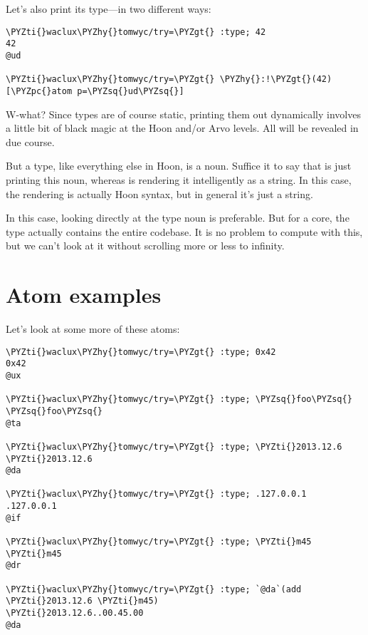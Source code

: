 Let's also print its type---in two different ways:

\begin{framed_shaded}
\begin{Verbatim}[fontsize=\relsize{-2.5},fontseries=b,commandchars=\\\{\}]
\PYZti{}waclux\PYZhy{}tomwyc/try=\PYZgt{} :type; 42
42
@ud

\PYZti{}waclux\PYZhy{}tomwyc/try=\PYZgt{} \PYZhy{}:!\PYZgt{}(42)
[\PYZpc{}atom p=\PYZsq{}ud\PYZsq{}]
\end{Verbatim}
\end{framed_shaded}

W-what?  Since types are of course static, printing them out
dynamically involves a little bit of black magic at the Hoon
and/or Arvo levels.  All will be revealed in due course.

But a type, like everything else in Hoon, is a noun.  Suffice it
to say that  is just printing this noun, whereas
 is rendering it intelligently as a string.  In this
case, the rendering is actually Hoon syntax, but in general it's
just a string.

In this case, looking directly at the type noun is preferable.
But for a core, the type actually contains the entire codebase.
It is no problem to compute with this, but we can't look at it
without scrolling more or less to infinity.

\section{Atom examples}

Let's look at some more of these atoms:

\begin{framed_shaded}
\begin{Verbatim}[fontsize=\relsize{-2.5},fontseries=b,commandchars=\\\{\}]
\PYZti{}waclux\PYZhy{}tomwyc/try=\PYZgt{} :type; 0x42
0x42
@ux

\PYZti{}waclux\PYZhy{}tomwyc/try=\PYZgt{} :type; \PYZsq{}foo\PYZsq{}
\PYZsq{}foo\PYZsq{}
@ta

\PYZti{}waclux\PYZhy{}tomwyc/try=\PYZgt{} :type; \PYZti{}2013.12.6
\PYZti{}2013.12.6
@da

\PYZti{}waclux\PYZhy{}tomwyc/try=\PYZgt{} :type; .127.0.0.1
.127.0.0.1
@if

\PYZti{}waclux\PYZhy{}tomwyc/try=\PYZgt{} :type; \PYZti{}m45
\PYZti{}m45
@dr

\PYZti{}waclux\PYZhy{}tomwyc/try=\PYZgt{} :type; `@da`(add \PYZti{}2013.12.6 \PYZti{}m45)
\PYZti{}2013.12.6..00.45.00
@da
\end{Verbatim}
\end{framed_shaded}

